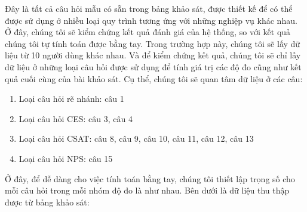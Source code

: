Đây là tất cả câu hỏi mẫu có sẵn trong bảng khảo sát, được thiết kế để có thể được sử dụng ở nhiều loại quy trình tương ứng với những nghiệp vụ khác nhau. 
Ở đây, chúng tôi sẽ kiểm chứng kết quả đánh giá của hệ thống, so với kết quả chúng tôi tự tính toán được bằng tay. Trong trường hợp này, 
chúng tôi sẽ lấy dữ liệu từ 10 người dùng khác nhau. Và để kiểm chứng kết quả, chúng tôi sẽ chỉ lấy dữ liệu ở những loại câu hỏi được sử dụng để 
tính giá trị các độ đo cũng như kết quả cuối cùng của bài khảo sát. Cụ thể, chúng tôi sẽ quan tâm dữ liệu ở các câu:
\begin{enumerate}
    \item Loại câu hỏi rẽ nhánh: câu 1
    \item Loại câu hỏi CES: câu 3, câu 4
    \item Loại câu hỏi CSAT: câu 8, câu 9, câu 10, câu 11, câu 12, câu 13
    \item Loại câu hỏi NPS: câu 15
\end{enumerate}

Ở đây, để dễ dàng cho việc tính toán bằng tay, chúng tôi thiết lập trọng số cho mỗi câu hỏi trong mỗi nhóm độ đo là như nhau. Bên dưới là dữ liệu thu thập được từ bảng khảo sát:

